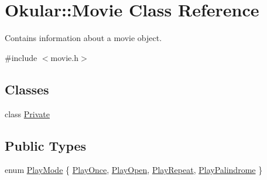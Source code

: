 \hypertarget{classOkular_1_1Movie}{\section{Okular\+:\+:Movie Class Reference}
\label{classOkular_1_1Movie}
}


Contains information about a movie object.  




{\ttfamily \#include $<$movie.\+h$>$}

\subsection*{Classes}
\begin{DoxyCompactItemize}
\item 
class \hyperlink{classMovie_1_1Private}{Private}
\end{DoxyCompactItemize}
\subsection*{Public Types}
\begin{DoxyCompactItemize}
\item 
enum \hyperlink{classOkular_1_1Movie_ac15c187b1f32107f51813a0da17e099b}{Play\+Mode} \{ \hyperlink{classOkular_1_1Movie_ac15c187b1f32107f51813a0da17e099ba70bb38b13a47dd04b9140e830ed00acf}{Play\+Once}, 
\hyperlink{classOkular_1_1Movie_ac15c187b1f32107f51813a0da17e099ba90b46cfe98cc6e11909323cb0a1deb79}{Play\+Open}, 
\hyperlink{classOkular_1_1Movie_ac15c187b1f32107f51813a0da17e099bae5df974ff070edfa063900e2b2a3064e}{Play\+Repeat}, 
\hyperlink{classOkular_1_1Movie_ac15c187b1f32107f51813a0da17e099ba0062c8a114d099c166bde1d6f54133d9}{Play\+Palindrome}
 \}
\end{DoxyCompactItemize}
